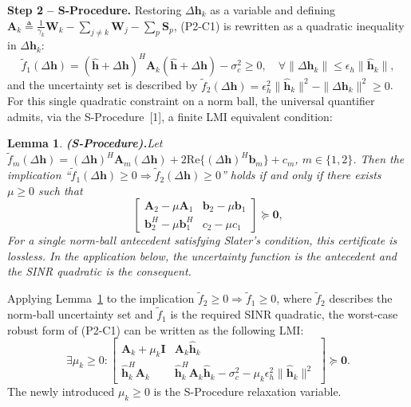 \documentclass[12pt,a4paper]{article}
\newtheorem{lemma}{Lemma}
\newcommand{\vect}[1]{\mathbf{#1}}
\newcommand{\mat}[1]{\mathbf{#1}}
\newcommand{\Real}{\text{Re}}
\begin{document}
\textbf{Step 2 -- S-Procedure.} Restoring $\Delta\vect{h}_k$ as a variable and defining $\mat{A}_k \triangleq \frac{1}{\gamma_k} \mat{W}_k - \sum_{j \neq k} \mat{W}_j - \sum_{p} \mat{S}_p$, (P2-C1) is rewritten as a quadratic inequality in $\Delta\vect{h}_k$:
\[
\tilde{f}_1(\Delta\vect{h}) = (\hat{\vect{h}} + \Delta\vect{h})^H \mat{A}_k (\hat{\vect{h}} + \Delta\vect{h}) - \sigma_c^2 \geq 0, \quad \forall \|\Delta\vect{h}_k\| \leq \epsilon_h \|\hat{\vect{h}}_k\|,
\]
and the uncertainty set is described by $\tilde{f}_2(\Delta\vect{h}) = \epsilon_h^2 \|\hat{\vect{h}}_k\|^2 - \|\Delta\vect{h}_k\|^2 \geq 0$. For this single quadratic constraint on a norm ball, the universal quantifier admits, via the S-Procedure~[1], a finite LMI equivalent condition:

\begin{lemma}\textbf{(S-Procedure).}\label{lem:s-procedure}
Let $\tilde{f}_m(\Delta\vect{h}) = (\Delta\vect{h})^H \mat{A}_m (\Delta\vect{h}) + 2\Real\{(\Delta\vect{h})^H \vect{b}_m\} + c_m$, $m \in \{1, 2\}$. Then the implication ``$\tilde{f}_1(\Delta\vect{h}) \geq 0 \Rightarrow \tilde{f}_2(\Delta\vect{h}) \geq 0$'' holds \emph{if and only if} there exists $\mu \geq 0$ such that
\[
\begin{bmatrix} \mat{A}_2 - \mu \mat{A}_1 & \vect{b}_2 - \mu \vect{b}_1 \\ \vect{b}_2^H - \mu \vect{b}_1^H & c_2 - \mu c_1 \end{bmatrix} \succeq \mat{0},
\]
For a single norm-ball antecedent satisfying Slater's condition, this certificate is lossless. In the application below, the uncertainty function is the antecedent and the SINR quadratic is the consequent.
\end{lemma}

Applying Lemma~\ref{lem:s-procedure} to the implication $\tilde{f}_2 \geq 0 \Rightarrow \tilde{f}_1 \geq 0$, where $\tilde{f}_2$ describes the norm-ball uncertainty set and $\tilde{f}_1$ is the required SINR quadratic, the worst-case robust form of (P2-C1) can be written as the following LMI:
\begin{equation}
\exists \mu_k \geq 0: \begin{bmatrix} \mat{A}_k + \mu_k \mat{I} & \mat{A}_k \hat{\vect{h}}_k \\[1.2ex] \hat{\vect{h}}_k^H \mat{A}_k & \hat{\vect{h}}_k^H \mat{A}_k \hat{\vect{h}}_k - \sigma_c^2 - \mu_k \epsilon_h^2 \|\hat{\vect{h}}_k\|^2 \end{bmatrix} \succeq \mat{0}. \tag{S3.1}
\end{equation}
The newly introduced $\mu_k \geq 0$ is the S-Procedure relaxation variable.
\end{document}
